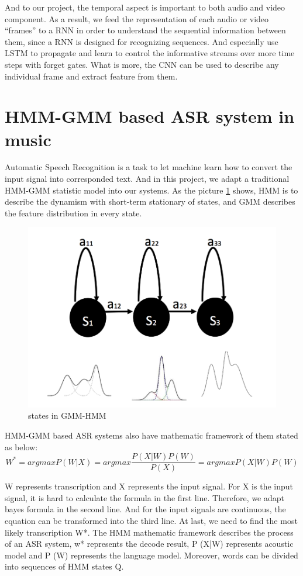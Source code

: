 And to our project, the temporal aspect is important to both audio and video component. As a result, we feed the representation of each audio or video “frames” to a RNN in order to understand the sequential information between them, since a RNN is designed for recognizing sequences.  And especially use LSTM
to propagate and learn to control the informative streams over more time steps with forget gates. What is more, the CNN can be used to describe any individual frame and extract feature from them.

\section{HMM-GMM based ASR system in music}
Automatic Speech Recognition is a task to let machine learn how to convert the input signal into corresponded text.  And in this project, we adapt a traditional HMM-GMM statistic model into our systems. As the picture \ref{fig:hmmgmm} shows, HMM is to describe the dynamism with short-term stationary of states, and GMM describes the feature distribution in every state.
\begin{figure}[ht]
\centering
\includegraphics[width=0.5\linewidth]{figures/hmmgmm.png}
\caption{states in GMM-HMM}
\label{fig:hmmgmm}
\end{figure}
HMM-GMM based ASR systems also have mathematic framework of them stated as below: 
        \begin{equation}
        W^{*}=arg max P(W|X)
       =arg max\frac{P(X|W)P(W)}{P(X)}
       =arg max P(X|W)P(W)
        \end{equation} 
        
W represents transcription and X represents the input signal. For X is the input signal, it is hard to calculate the formula in the first line. Therefore, we adapt bayes formula in the second line. And for the input signals are continuous, the equation can be transformed into the third line.  At last, we need to find the most likely transcription W*. The HMM mathematic framework describes the process of an ASR system, w* represents the decode result, P (X|W) represents acoustic model and P (W) represents the language model. 
Moreover, words can be divided into sequences of HMM states Q. 
           

